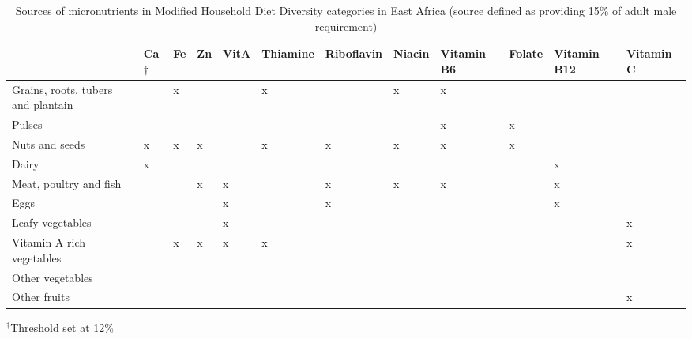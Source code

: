 \begin{table}[H]
  \captionsetup{singlelinecheck = false, justification=justified}
  \caption{Sources of micronutrients in Modified Household Diet Diversity categories in East Africa (source defined as providing 15\% of adult male requirement)}
  \label{tab:C_4}
  \small
\begin{tabularx}{\textwidth}{@{}lYYYYYYYYYYY@{}}
\toprule
~ & Ca${\dag}$ & Fe & Zn & VitA & Thiamine & Riboflavin & Niacin & Vitamin B6 & Folate & Vitamin B12 & Vitamin C \\
\midrule
Grains, roots, tubers and plantain & & x & & & x & & x & x & & & \\
Pulses & & & & & & & & x & x & & \\
Nuts and seeds & x & x & x & & x & x & x & x & x & & \\
Dairy & x & & & & & & & & & x & \\
Meat, poultry and fish & & & x & x & & x & x & x & & x & \\
Eggs & & & & x & & x & & & & x & \\
Leafy vegetables & & & & x & & & & & & & x \\
Vitamin A rich vegetables & & x & x & x & x & & & & & & x \\
Other vegetables & & & & & & & & & & & \\
Other fruits & & & & & & & & & & & x \\
\bottomrule
\end{tabularx}
\footnotesize
\raggedright
$^{\dag}$Threshold set at 12\%
\end{table}



